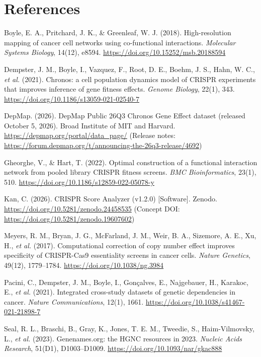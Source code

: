 \documentclass[11pt,a4paper]{article}
\begin{document}
\section*{References}
\small
\begin{list}{}{\setlength{\leftmargin}{1.5em}\setlength{\itemindent}{-1.5em}\setlength{\itemsep}{0.35em}\setlength{\parsep}{0pt}}
\item Boyle, E. A., Pritchard, J. K., \& Greenleaf, W. J. (2018). High-resolution mapping of cancer cell networks using co-functional interactions. \textit{Molecular Systems Biology}, 14(12), e8594. \url{https://doi.org/10.15252/msb.20188594}
\item Dempster, J. M., Boyle, I., Vazquez, F., Root, D. E., Boehm, J. S., Hahn, W. C., \textit{et al.} (2021). Chronos: a cell population dynamics model of CRISPR experiments that improves inference of gene fitness effects. \textit{Genome Biology}, 22(1), 343. \url{https://doi.org/10.1186/s13059-021-02540-7}
\item DepMap. (2026). DepMap Public 26Q3 Chronos Gene Effect dataset (released October 5, 2026). Broad Institute of MIT and Harvard. \url{https://depmap.org/portal/data\_page/} (Release notes: \url{https://forum.depmap.org/t/announcing-the-26q3-release/4692})
\item Gheorghe, V., \& Hart, T. (2022). Optimal construction of a functional interaction network from pooled library CRISPR fitness screens. \textit{BMC Bioinformatics}, 23(1), 510. \url{https://doi.org/10.1186/s12859-022-05078-y}
\item Kan, C. (2026). CRISPR Score Analyzer (v1.2.0) [Software]. Zenodo. \url{https://doi.org/10.5281/zenodo.24458535} (Concept DOI: \url{https://doi.org/10.5281/zenodo.19607602})
\item Meyers, R. M., Bryan, J. G., McFarland, J. M., Weir, B. A., Sizemore, A. E., Xu, H., \textit{et al.} (2017). Computational correction of copy number effect improves specificity of CRISPR-Cas9 essentiality screens in cancer cells. \textit{Nature Genetics}, 49(12), 1779--1784. \url{https://doi.org/10.1038/ng.3984}
\item Pacini, C., Dempster, J. M., Boyle, I., Gon\c{c}alves, E., Najgebauer, H., Karakoc, E., \textit{et al.} (2021). Integrated cross-study datasets of genetic dependencies in cancer. \textit{Nature Communications}, 12(1), 1661. \url{https://doi.org/10.1038/s41467-021-21898-7}
\item Seal, R. L., Braschi, B., Gray, K., Jones, T. E. M., Tweedie, S., Haim-Vilmovsky, L., \textit{et al.} (2023). Genenames.org: the HGNC resources in 2023. \textit{Nucleic Acids Research}, 51(D1), D1003--D1009. \url{https://doi.org/10.1093/nar/gkac888}

\end{list}
\end{document}
